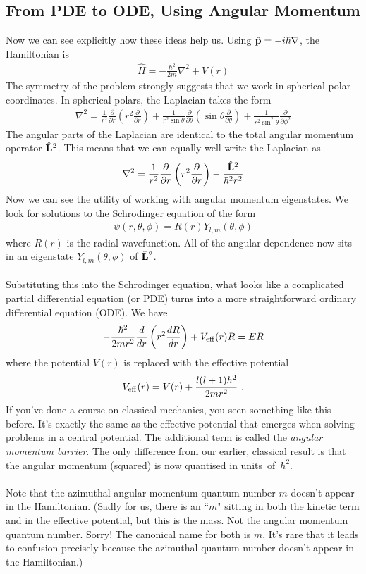 \documentclass[12pt]{article}
\def\be{\begin{eqnarray}}
\def\ee{\end{eqnarray}}
\newcommand{\nn}{\nonumber}
\newcommand\para{\paragraph{}}
\newcommand{\ppp}[2]{\frac{\partial {#1}}{\partial {#2}}}
\newcommand{\co}{\color{olive}}
\begin{document}
{\subsection*{From PDE to ODE, Using Angular Momentum}

Now we can see explicitly how these ideas help us. {\co  Using $\hat{\bf p} = -i\hbar\nabla$, the Hamiltonian is
%
\be \hat{H} = -\frac{\hbar^2}{2m}\nabla^2 + V(r)\nn\ee
%
}
The symmetry of the problem strongly suggests that we work in spherical polar coordinates. {\co In spherical polars, the Laplacian takes the form
%
\be \nabla^2 = \frac{1}{r^2}\ppp{}{r}\left(r^2\ppp{}{r}\right) + \frac{1}{r^2\sin\theta}\ppp{}{\theta}\left(\sin\theta \ppp{}{\theta} \right)+ \frac{1}{r^2\sin^2\theta}\ppp{}{\phi^2} \nn\ee
%
The angular parts of the Laplacian are identical to the total angular momentum operator $\hat{\bf L}^2$. This means that we can equally well write the Laplacian as 
%
\be \nabla^2 = \frac{1}{r^2}\ppp{}{r}\left(r^2\ppp{}{r}\right) -\frac{\hat{\bf L}^2}{\hbar^2r^2} \nn\ee
}
Now we can see the utility of working with angular momentum eigenstates. {\co  We look for solutions to the Schrodinger equation of the form
%
\be \psi(r,\theta,\phi) = R(r) Y_{l,m}(\theta,\phi)\ee
%
where $R(r)$ is the radial wavefunction. 
All of the angular dependence now sits in an eigenstate $Y_{l,m}(\theta,\phi)$ of $\hat{\bf L}^2$. }

\para
Substituting this into the Schrodinger equation, what looks like a complicated partial differential equation (or PDE) turns into a more straightforward ordinary differential equation  (ODE). {\co We have
%
\be -\frac{\hbar^2}{2mr^2}\frac{d}{dr}\left(r^2\frac{dR}{dr}\right) + V_{\rm eff}(r) R = ER\nn\ee
%
where the potential $V(r)$ is replaced with the effective potential
%
\be V_{\rm eff}(r) = V(r) +\frac{l(l+1)\hbar^2}{2mr^2}\ .\nn\ee
%
}
If you've done a course on classical mechanics, you seen something like this before. It's exactly the same as the effective potential that emerges when solving problems in a central potential.  The additional term is called the {\it angular momentum barrier}. The  only difference from our earlier, classical result is that the  angular momentum (squared) is now quantised in \mbox{units of $\hbar^2$.}  

\para
Note that the azimuthal angular momentum quantum number $m$ doesn't appear in the Hamiltonian. (Sadly for us, there is an ``$m$" sitting in both the kinetic term and in the effective potential, but this is the mass. Not the angular momentum quantum number. Sorry! The canonical name for both is $m$. It's rare that it leads to confusion precisely because the azimuthal quantum number doesn't appear in the Hamiltonian.)

}
\end{document}
